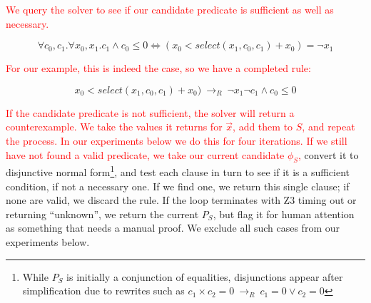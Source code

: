\documentclass[acmsmall,review]{acmart}\settopmatter{printfolios=true,printccs=false,printacmref=false}
\newcommand{\modified}[1]{\textcolor{red}{{#1}}}
\newcommand{\rewrites}[0]{\:\rightarrow_{R}\:}
\begin{document}
\modified{We query the solver to see if our candidate predicate is sufficient as well as necessary. }

\[ \forall{c_0, c_1} . \forall{x_0, x_1} . c_1 \wedge c_0 \le 0 \iff (x_0 < select(x_1, c_0, c_1) + x_0) = \neg x_1
\]

\modified{For our example, this is indeed the case, so we have a completed rule:}

\[ x_0 < select(x_1, c_0, c_1) + x_0) \rewrites \neg x_1 \neg c_1 \wedge c_0 \le 0
\]

\modified{If the candidate predicate is not sufficient, the solver will return a counterexample.
We take the values it returns for $\vec{x}$, add them to $S$, and repeat the process. 
In our experiments below we do this for four iterations. If we still have not found a 
valid predicate, we take our current candidate $\phi_S$,} convert it to disjunctive normal
form\footnote{While $P_S$ is initially a conjunction of equalities,
  disjunctions appear after simplification due to rewrites such as
  $c_1 \times c_2 = 0 \rewrites c_1 = 0 \vee c_2 = 0$}, and test
each clause in turn to see if it is a sufficient condition, if not a
necessary one. If we find one, we return this single clause; if none are valid, 
we discard the rule.
If the loop terminates with Z3 timing out or returning ``unknown'', we return
the current $P_S$, but flag it for human attention as something that
needs a manual proof. We exclude all such cases from our experiments
below.

\end{document}
